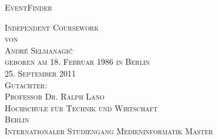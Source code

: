 \thispagestyle{empty}


\begin{center}

\vspace*{2cm}
\Large
\textsc{EventFinder}\\

\vspace{4cm}

\textsc{Independent Coursework\\[0.5\baselineskip]
von\\[0.5\baselineskip]
André Selmanagi\'{c}\\
{\normalsize \textsc{geboren am 18. Februar 1986 in Berlin}}}\\

\vspace{4cm}
\textsc{25. September 2011}\\ %

\vspace{1cm}
\textsc{Gutachter:\\
Professor Dr. Ralph Lano}\\

\vspace{1cm}
\textsc{Hochschule für Technik und Wirtschaft\\
Berlin\\
Internationaler Studiengang Medieninformatik Master}

\end{center}

\addtocounter{page}{-1}
